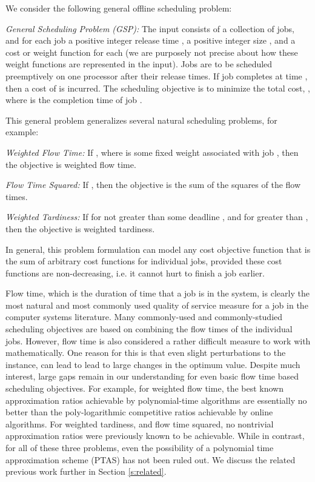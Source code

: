 \documentclass[11pt]{article}
\begin{document}
We consider the following general offline scheduling problem:

\medskip
{\em General Scheduling Problem (GSP):}
The input consists of a collection of  jobs, and for each job 
a positive integer release time ,
a positive integer size , 
and a cost or weight function  for each  
(we are purposely not precise about how these weight functions are represented
in the input). 
Jobs are to be scheduled preemptively on
one processor after their release times.  If job  completes at time , then a
cost of  is incurred. The scheduling objective is to minimize
the total cost, , where  is the completion
time of job .




This general problem generalizes several natural scheduling problems, for example:

\medskip
{\em Weighted Flow Time:}
If , where  is some fixed 
weight associated with job , then the objective is weighted flow time.

\smallskip

{\em Flow Time Squared:}
If , then the objective is the sum of the squares of the flow times. 

\smallskip

{\em Weighted Tardiness:}
If  for  not greater than some deadline ,
and  for  greater than ,
then the objective is weighted tardiness.
\medskip


In general, this problem formulation can model any cost objective function that is the 
sum of arbitrary cost functions for individual jobs, provided these cost functions are non-decreasing, i.e. it cannot hurt to finish a job earlier.

Flow time, which is the duration of time  
that a job is in the system,
is clearly the most natural and most commonly used quality of service measure for a job
in the computer systems literature.
Many commonly-used and commonly-studied scheduling objectives are based on combining
the flow times of the individual jobs.
However, flow time is also considered a rather difficult measure to work with mathematically. 
One reason for this is that even slight perturbations to the instance, can lead to
lead to large changes in the optimum value. 
Despite much interest, large gaps remain in our understanding for even basic 
flow time based scheduling objectives.
For example, for weighted flow time, the best known approximation ratios achievable by
polynomial-time algorithms are essentially no better than the poly-logarithmic 
competitive ratios achievable by online algorithms. 
For weighted tardiness, and flow time squared, no nontrivial approximation ratios were 
previously known
to be achievable.
While in contrast, for all of these three problems,
even the possibility of a polynomial time approximation scheme (PTAS) 
has not been ruled out.
We discuss the related previous work further in Section \ref{s:related}.
\end{document}
